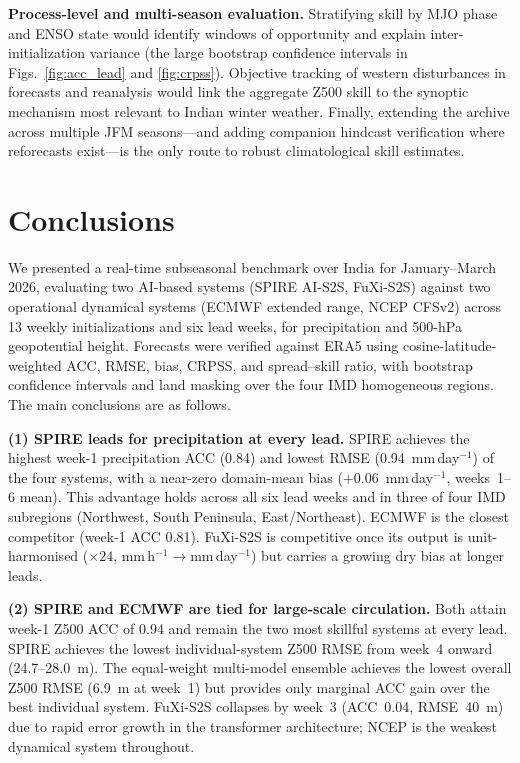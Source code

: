 \documentclass[11pt]{article}
\begin{document}
\textbf{Process-level and multi-season evaluation.}
Stratifying skill by MJO phase \citep{wheelerhendon2004} and ENSO
state \citep{mariotti2020,domeisen2022} would identify windows of
opportunity and explain inter-initialization variance (the large
bootstrap confidence intervals in Figs.~\ref{fig:acc_lead} and
\ref{fig:crpss}). Objective tracking of western disturbances in
forecasts and reanalysis \citep{hunt2018,dimri2015} would link the
aggregate Z500 skill to the synoptic mechanism most relevant to Indian
winter weather. Finally, extending the archive across multiple JFM
seasons---and adding companion hindcast verification where reforecasts
exist---is the only route to robust climatological skill estimates.

\section{Conclusions}\label{sec:conclusions}

We presented a real-time subseasonal benchmark over India for
January--March 2026, evaluating two AI-based systems (SPIRE AI-S2S,
FuXi-S2S) against two operational dynamical systems (ECMWF extended
range, NCEP CFSv2) across 13 weekly initializations and six lead weeks,
for precipitation and 500-hPa geopotential height. Forecasts were
verified against ERA5 using cosine-latitude-weighted ACC, RMSE, bias,
CRPSS, and spread--skill ratio, with bootstrap confidence intervals and
land masking over the four IMD homogeneous regions. The main conclusions
are as follows.

\textbf{(1) SPIRE leads for precipitation at every lead.}
SPIRE achieves the highest week-1 precipitation ACC (0.84) and lowest
RMSE (0.94~mm\,day$^{-1}$) of the four systems, with a near-zero
domain-mean bias ($+0.06$~mm\,day$^{-1}$, weeks~1--6 mean). This
advantage holds across all six lead weeks and in three of four IMD
subregions (Northwest, South Peninsula, East/Northeast). ECMWF is the
closest competitor (week-1 ACC 0.81). FuXi-S2S is competitive once its
output is unit-harmonised ($\times24$, mm\,h$^{-1}\!\to$mm\,day$^{-1}$)
but carries a growing dry bias at longer leads.

\textbf{(2) SPIRE and ECMWF are tied for large-scale circulation.}
Both attain week-1 Z500 ACC of 0.94 and remain the two most skillful
systems at every lead. SPIRE achieves the lowest individual-system Z500
RMSE from week~4 onward (24.7--28.0~m). The equal-weight multi-model
ensemble achieves the lowest overall Z500 RMSE (6.9~m at week~1) but
provides only marginal ACC gain over the best individual system. FuXi-S2S
collapses by week~3 (ACC~0.04, RMSE~40~m) due to rapid error growth in
the transformer architecture; NCEP is the weakest dynamical system
throughout.
\end{document}
